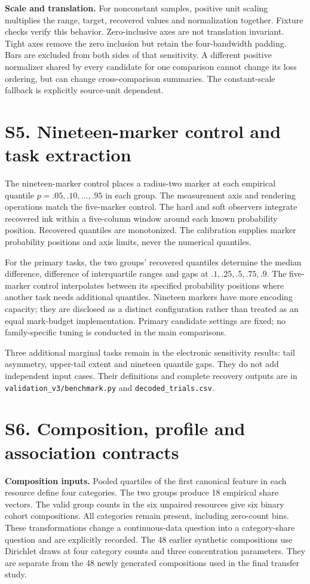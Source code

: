 \documentclass[10pt]{article}
\begin{document}
\textbf{Scale and translation.} For nonconstant samples, positive unit scaling multiplies the range, target, recovered values and normalization together. Fixture checks verify this behavior. Zero-inclusive axes are not translation invariant. Tight axes remove the zero inclusion but retain the four-bandwidth padding. Bars are excluded from both sides of that sensitivity. A different positive normalizer shared by every candidate for one comparison cannot change its loss ordering, but can change cross-comparison summaries. The constant-scale fallback is explicitly source-unit dependent.

\section*{S5. Nineteen-marker control and task extraction}
The nineteen-marker control places a radius-two marker at each empirical quantile $p=.05,.10,\ldots,.95$ in each group. The measurement axis and rendering operations match the five-marker control. The hard and soft observers integrate recovered ink within a five-column window around each known probability position. Recovered quantiles are monotonized. The calibration supplies marker probability positions and axis limits, never the numerical quantiles.

For the primary tasks, the two groups' recovered quantiles determine the median difference, difference of interquartile ranges and gaps at $.1,.25,.5,.75,.9$. The five-marker control interpolates between its specified probability positions where another task needs additional quantiles. Nineteen markers have more encoding capacity; they are disclosed as a distinct configuration rather than treated as an equal mark-budget implementation. Primary candidate settings are fixed; no family-specific tuning is conducted in the main comparisons.

Three additional marginal tasks remain in the electronic sensitivity results: tail asymmetry, upper-tail extent and nineteen quantile gaps. They do not add independent input cases. Their definitions and complete recovery outputs are in \texttt{validation\_v3/benchmark.py} and \texttt{decoded\_trials.csv}.

\section*{S6. Composition, profile and association contracts}
\textbf{Composition inputs.} Pooled quartiles of the first canonical feature in each resource define four categories. The two groups produce 18 empirical share vectors. The valid group counts in the six unpaired resources give six binary cohort compositions. All categories remain present, including zero-count bins. These transformations change a continuous-data question into a category-share question and are explicitly recorded. The 48 earlier synthetic compositions use Dirichlet draws at four category counts and three concentration parameters. They are separate from the 48 newly generated compositions used in the final transfer study.
\end{document}
